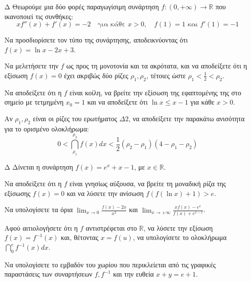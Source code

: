 \begin{thema}{Δ}
Θεωρούμε μια δύο φορές παραγωγίσιμη συνάρτηση $f: (0, +\infty) \to \mathbb{R}$ που ικανοποιεί τις συνθήκες:
\[ x f''(x) + f'(x) = -2 \quad \text{για κάθε } x > 0, \quad f(1)=1 \text{ και } f'(1)=-1 \]
\begin{erwthma}
    \item Να προσδιορίσετε τον τύπο της συνάρτησης, αποδεικνύοντας ότι $f(x) = \ln x - 2x + 3$.
    \item Να μελετήσετε την $f$ ως προς τη μονοτονία και τα ακρότατα, και να αποδείξετε ότι η εξίσωση $f(x) = 0$ έχει ακριβώς δύο ρίζες $\rho_1, \rho_2$, τέτοιες ώστε $\displaystyle \rho_1 < \frac{1}{2} < \rho_2$.
    \item Να αποδείξετε ότι η $f$ είναι κοίλη, να βρείτε την εξίσωση της εφαπτομένης της στο σημείο με τετμημένη $x_0 = 1$ και να αποδείξετε ότι $\ln x \le x - 1$ για κάθε $x > 0$.
    \item Αν $\rho_1, \rho_2$ είναι οι ρίζες του ερωτήματος $\Delta 2$, να αποδείξετε την παρακάτω ανισότητα για το ορισμένο ολοκλήρωμα:
    \[ 0 < \dint_{\rho_1}^{\rho_2} f(x) dx < \frac{1}{2}(\rho_2 - \rho_1)(4 - \rho_1 - \rho_2) \]
\end{erwthma}
\end{thema}

\begin{thema}{Δ}
Δίνεται η συνάρτηση $f(x) = e^x + x - 1$, με $x \in \mathbb{R}$.
\begin{erwthma}
    \item Να αποδείξετε ότι η $f$ είναι γνησίως αύξουσα, να βρείτε τη μοναδική ρίζα της εξίσωσης $f(x) = 0$ και να λύσετε την ανίσωση $f(f(\ln x) + 1) > e$.
    \item Να υπολογίσετε τα όρια $\displaystyle\lim_{x\to 0} \frac{f(x) - 2x}{x^2}$ και $\displaystyle\lim_{x\to +\infty} \frac{x f(x) - e^x}{f(x) + e^{x-1}}$.
    \item Αφού αιτιολογήσετε ότι η $f$ αντιστρέφεται στο $\mathbb{R}$, να λύσετε την εξίσωση $f(x) = f^{-1}(x)$ και, θέτοντας $x = f(u)$, να υπολογίσετε το ολοκλήρωμα $\displaystyle \dint_0^e f^{-1}(x) dx$.
    \item Να υπολογίσετε το εμβαδόν του χωρίου που περικλείεται από τις γραφικές παραστάσεις των συναρτήσεων $f, f^{-1}$ και την ευθεία $x+y=e+1$.
\end{erwthma}
\end{thema}

